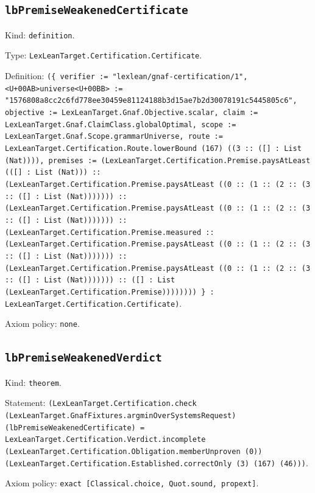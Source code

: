 \documentclass[11pt]{article}
\begin{document}
\subsection*{\texttt{lbPremiseWeakenedCertificate}}
\noindent Kind: \texttt{definition}.\par
\noindent Type: \texttt{LexLeanTarget.Certification.Certificate}.\par
\noindent Definition: \texttt{(\{ verifier := "lexlean/gnaf-certification/1", <U+00AB>universe<U+00BB> := "1576808a8cc2c6fd778ee30459e81124188b3d15ae7b2d30078191c5445805c6", objective := LexLeanTarget.Gnaf.Objective.scalar, claim := LexLeanTarget.Gnaf.ClaimClass.globalOptimal, scope := LexLeanTarget.Gnaf.Scope.grammarUniverse, route := LexLeanTarget.Certification.Route.lowerBound (167) ((3 :: ([] : List (Nat)))), premises := (LexLeanTarget.Certification.Premise.paysAtLeast (([] : List (Nat))) :: (LexLeanTarget.Certification.Premise.paysAtLeast ((0 :: (1 :: (2 :: (3 :: ([] : List (Nat))))))) :: (LexLeanTarget.Certification.Premise.paysAtLeast ((0 :: (1 :: (2 :: (3 :: ([] : List (Nat))))))) :: (LexLeanTarget.Certification.Premise.measured :: (LexLeanTarget.Certification.Premise.paysAtLeast ((0 :: (1 :: (2 :: (3 :: ([] : List (Nat))))))) :: (LexLeanTarget.Certification.Premise.paysAtLeast ((0 :: (1 :: (2 :: (3 :: ([] : List (Nat))))))) :: ([] : List (LexLeanTarget.Certification.Premise)))))))) \} : LexLeanTarget.Certification.Certificate)}.\par
\noindent Axiom policy: \texttt{none}.\par
\subsection*{\texttt{lbPremiseWeakenedVerdict}}
\noindent Kind: \texttt{theorem}.\par
\noindent Statement: \texttt{(LexLeanTarget.Certification.check (LexLeanTarget.GnafFixtures.argminOverSystemsRequest) (lbPremiseWeakenedCertificate) = LexLeanTarget.Certification.Verdict.incomplete (LexLeanTarget.Certification.Obligation.memberUnproven (0)) (LexLeanTarget.Certification.Established.correctOnly (3) (167) (46)))}.\par
\noindent Axiom policy: \texttt{exact [Classical.choice, Quot.sound, propext]}.\par
\end{document}
